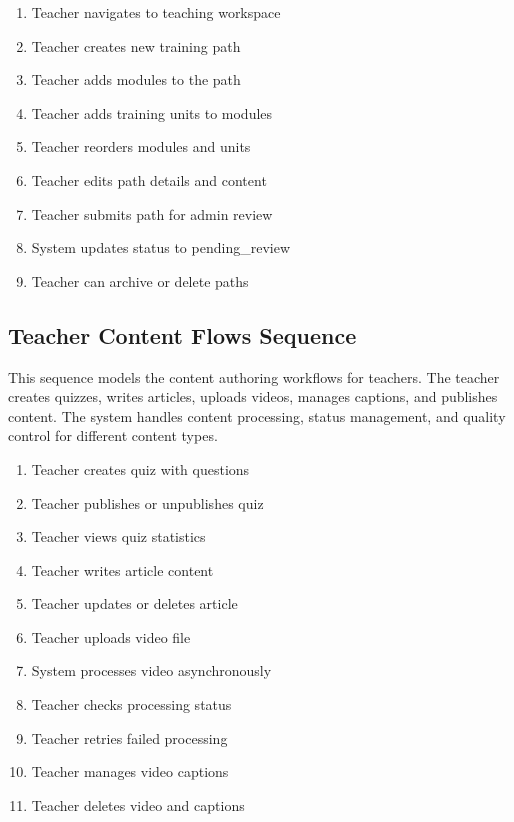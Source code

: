 \begin{enumerate}[topsep=0pt,itemsep=1pt,parsep=0pt,partopsep=0pt]
    \item Teacher navigates to teaching workspace
    \item Teacher creates new training path
    \item Teacher adds modules to the path
    \item Teacher adds training units to modules
    \item Teacher reorders modules and units
    \item Teacher edits path details and content
    \item Teacher submits path for admin review
    \item System updates status to pending\_review
    \item Teacher can archive or delete paths
\end{enumerate}


\subsection{Teacher Content Flows Sequence}
This sequence models the content authoring workflows for teachers. The teacher
creates quizzes, writes articles, uploads videos, manages captions, and
publishes content. The system handles content processing, status management,
and quality control for different content types.

\begin{enumerate}[topsep=0pt,itemsep=1pt,parsep=0pt,partopsep=0pt]
    \item Teacher creates quiz with questions
    \item Teacher publishes or unpublishes quiz
    \item Teacher views quiz statistics
    \item Teacher writes article content
    \item Teacher updates or deletes article
    \item Teacher uploads video file
    \item System processes video asynchronously
    \item Teacher checks processing status
    \item Teacher retries failed processing
    \item Teacher manages video captions
    \item Teacher deletes video and captions
\end{enumerate}

